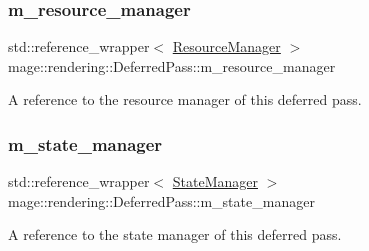 \subsubsection{\texorpdfstring{m\+\_\+resource\+\_\+manager}{m\_resource\_manager}}
{\footnotesize\ttfamily std\+::reference\+\_\+wrapper$<$ \hyperlink{classmage_1_1rendering_1_1_resource_manager}{Resource\+Manager} $>$ mage\+::rendering\+::\+Deferred\+Pass\+::m\+\_\+resource\+\_\+manager\hspace{0.3cm}{\ttfamily [private]}}

A reference to the resource manager of this deferred pass. \hypertarget{classmage_1_1rendering_1_1_deferred_pass_aaeabb408d0454f13fdabad2a8e668f61}{}\label{classmage_1_1rendering_1_1_deferred_pass_aaeabb408d0454f13fdabad2a8e668f61} 
\subsubsection{\texorpdfstring{m\+\_\+state\+\_\+manager}{m\_state\_manager}}
{\footnotesize\ttfamily std\+::reference\+\_\+wrapper$<$ \hyperlink{classmage_1_1rendering_1_1_state_manager}{State\+Manager} $>$ mage\+::rendering\+::\+Deferred\+Pass\+::m\+\_\+state\+\_\+manager\hspace{0.3cm}{\ttfamily [private]}}

A reference to the state manager of this deferred pass. 